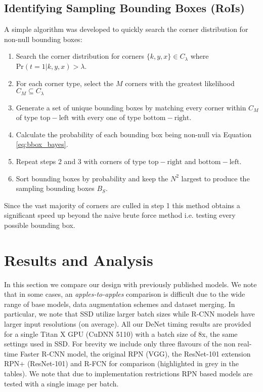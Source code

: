 \documentclass[10pt,twocolumn]{article}
\begin{document}
\subsection{Identifying Sampling Bounding Boxes (RoIs)} \label{sec:implement_sample_bbox} 

A simple algorithm was developed to quickly search the corner distribution for non-null bounding boxes:
\begin{enumerate}
\item Search the corner distribution for corners $\lbrace k,y,x \rbrace \in C_{\lambda}$ where $\mathrm{Pr}(t=1 | k,y,x) > \lambda$. \item For each corner type, select the $M$ corners with the greatest likelihood $C_M \subseteq C_{\lambda}$
\item Generate a set of unique bounding boxes by matching every corner within $C_M$ of type $\mathrm{top-left}$ with every one of type $\mathrm{bottom-right}$.
\item Calculate the probability of each bounding box being non-null via Equation \ref{eq:bbox_bayes}.
\item Repeat steps 2 and 3 with corners of type $\mathrm{top-right}$ and $\mathrm{bottom-left}$.
\item Sort bounding boxes by probability and keep the $N^2$ largest to produce the sampling bounding boxes $B_S$.
\end{enumerate}
Since the vast majority of corners are culled in step 1 this method obtains a significant speed up beyond the naive brute force method i.e. testing every possible bounding box. 

\section{Results and Analysis}

In this section we compare our design with previously published models. We note that in some cases, an \textit{apples-to-apples} comparison is difficult due to the wide range of base models, data augmentation schemes and dataset merging. In particular, we note that SSD utilize larger batch sizes while R-CNN models have larger input resolutions (on average). All our DeNet timing results are provided for a single Titan X GPU (CuDNN 5110) with a batch size of 8x, the same settings used in SSD. For brevity we include only three flavours of the non real-time Faster R-CNN model, the original RPN (VGG), the ResNet-101 extension RPN+ (ResNet-101) and R-FCN for comparison (highlighted in grey in the tables). We note that due to implementation restrictions RPN based models are tested with a single image per batch.
\end{document}
